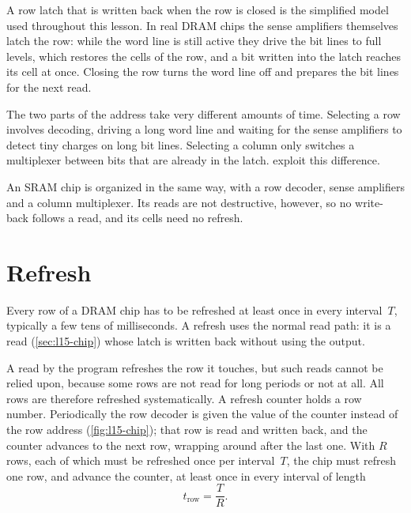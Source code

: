 \documentclass[../main.tex]{subfiles}
\begin{document}
\begin{note}
  \label{note:l15-model}
  A row latch that is written back when the row is closed is the simplified
  model used throughout this lesson.  In real DRAM chips the sense amplifiers
  themselves latch the row: while the word line is still active they drive
  the bit lines to full levels, which restores the cells of the row, and a bit
  written into the latch reaches its cell at once.  Closing the row turns the
  word line off and prepares the bit lines for the next read.
\end{note}

The two parts of the address take very different amounts of time.  Selecting a
row involves decoding, driving a long word line and waiting for the sense
amplifiers to detect tiny charges on long bit lines.  Selecting a column only
switches a multiplexer between bits that are already in the latch.
 exploit this difference.

\begin{note}
  An SRAM chip is organized in the same way, with a row decoder, sense
  amplifiers and a column multiplexer.  Its reads are not destructive,
  however, so no write-back follows a read, and its cells need no refresh.
\end{note}

\section{Refresh}
\label{sec:l15-refresh}

Every row of a DRAM chip has to be refreshed at least once in every
interval~$T$, typically a few tens of milliseconds.  A refresh uses the normal read path: it is a read
(\cref{sec:l15-chip}) whose latch is written back without using the
output.

A read by the program refreshes the row it touches, but such reads cannot be
relied upon, because some rows are not read for long periods or not at all.
All rows are therefore refreshed systematically.  A refresh counter holds a
row number.  Periodically the row decoder is given the value of the counter
instead of the row address (\cref{fig:l15-chip}); that row is read and written
back, and the counter advances to the next row, wrapping around after the last
one.  With $R$ rows, each of which must be refreshed once per interval~$T$,
the chip must refresh one row, and advance the counter, at least once in every
interval of length
\begin{equation}
  t_{\text{row}} = \frac{T}{R} .
  \label{eq:l15-refresh}
\end{equation}
\end{document}
